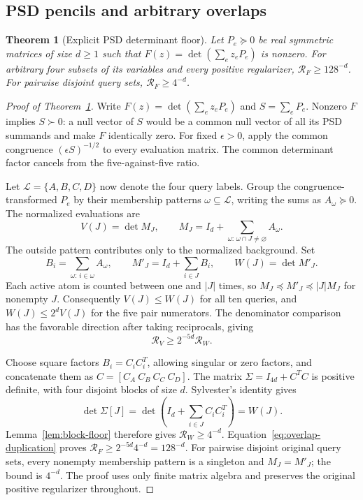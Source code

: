 \documentclass[11pt]{article}
\newtheorem{theorem}{Theorem}[section]
\theoremstyle{remark}
\begin{document}
\subsection{PSD pencils and arbitrary overlaps}

\begin{theorem}[Explicit PSD determinant floor]\label{thm:psd-floor}
Let $P_e\succeq0$ be real symmetric matrices of size $d\ge1$ such that
$F(z)=\det(\sum_e z_eP_e)$ is nonzero.
For arbitrary four subsets of its variables and every positive regularizer,
$\mathcal R_F\ge128^{-d}$.  For pairwise disjoint query sets,
$\mathcal R_F\ge4^{-d}$.
\end{theorem}

\begin{proof}[Proof of Theorem~\ref{thm:psd-floor}]
Write $F(z)=\det(\sum_e z_eP_e)$ and $S=\sum_eP_e$.
Nonzero $F$ implies $S\succ0$: a null vector of $S$ would be a common
null vector of all its PSD summands and make $F$ identically zero.
For fixed $\epsilon>0$, apply the common congruence
$(\epsilon S)^{-1/2}$ to every evaluation matrix.  The common determinant
factor cancels from the five-against-five ratio.

Let $\mathcal L=\{A,B,C,D\}$ now denote the four query labels.
Group the congruence-transformed $P_e$ by their membership patterns
$\omega\subseteq\mathcal L$, writing the sums as $A_\omega\succeq0$.
The normalized evaluations are
\[
 V(J)=\det M_J,\qquad
 M_J=I_d+\sum_{\omega:\,\omega\cap J\ne\varnothing}A_\omega .
\]
The outside pattern contributes only to the normalized background.
Set
\[
 B_i=\sum_{\omega:\,i\in\omega}A_\omega,\qquad
 M'_J=I_d+\sum_{i\in J}B_i,\qquad W(J)=\det M'_J.
\]
Each active atom is counted between one and $|J|$ times, so
$M_J\preceq M'_J\preceq |J|M_J$ for nonempty $J$.
Consequently $V(J)\le W(J)$ for all ten queries, and
$W(J)\le2^dV(J)$ for the five pair numerators.  The denominator comparison
has the favorable direction after taking reciprocals, giving
\begin{equation}
 \mathcal R_V\ge2^{-5d}\mathcal R_W.
 \label{eq:overlap-duplication}
\end{equation}

Choose square factors $B_i=C_iC_i^T$, allowing singular or zero factors,
and concatenate them as $C=[C_A\ C_B\ C_C\ C_D]$.
The matrix $\Sigma=I_{4d}+C^TC$ is positive definite, with four disjoint
blocks of size $d$.  Sylvester's identity gives
\[
 \det\Sigma[J]
 =\det\left(I_d+\sum_{i\in J}C_iC_i^T\right)=W(J).
\]
Lemma~\ref{lem:block-floor} therefore gives $\mathcal R_W\ge4^{-d}$.
Equation~\eqref{eq:overlap-duplication} proves
$\mathcal R_F\ge2^{-5d}4^{-d}=128^{-d}$.
For pairwise disjoint original query sets, every nonempty membership
pattern is a singleton and $M_J=M'_J$; the bound is $4^{-d}$.
The proof uses only finite matrix algebra and preserves the original
positive regularizer throughout.
\end{proof}
\end{document}
